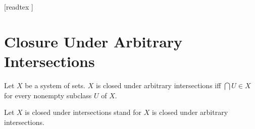 \documentclass[10pt]{article}
\begin{document}
  \begin{imports}
    \begin{forthel}
      [readtex ]
    \end{forthel}
  \end{imports}


  \section*{Closure Under Arbitrary Intersections}

  \begin{forthel}
    \begin{definition}[id=FOUNDATIONS_14_2369621166391296,printid]
      Let $X$ be a system of sets.
      $X$ is closed under arbitrary intersections iff $\bigcap U \in X$ for every nonempty subclass $U$ of $X$.
    \end{definition}

    Let $X$ is closed under intersections stand for $X$ is closed under arbitrary intersections.
  \end{forthel}
\end{document}
